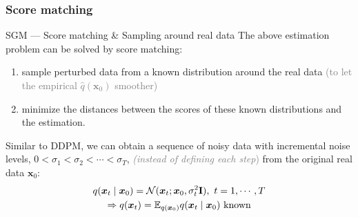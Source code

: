 \documentclass[10pt]{beamer}
\begin{document}
\subsubsection{Score matching}
\begin{frame}{SGM --- \normalsize Score matching \& Sampling around real data}
    The above estimation problem can be solved by score matching: 
    \begin{enumerate}
        \item sample perturbed data from a known distribution around the real data \textcolor{gray}{(to let the empirical $\hat{q}(\bm{x}_0)$ smoother)} 
        \item minimize the distances between the scores of these known distributions and the estimation.
    \end{enumerate}
    
    \bigskip
    
    Similar to DDPM, we can obtain a sequence of noisy data with incremental noise levels, 
    $0 < \sigma_1 < \sigma_2 < \cdots < \sigma_T$, \textcolor{gray}{\textit{(instead of defining each step})}
    from the original real data $\bm{x}_0$:
    \begin{gather}
        q(\bm{x}_t\mid\bm{x}_0) = \mathcal{N}(\bm{x}_t;\bm{x}_0,\sigma^2_t\mathbf{I}),~t=1,\cdots,T \label{eq:sgm}\\
        \Rightarrow q(\bm{x}_t) = \mathbb{E}_{q(\bm{x}_0)}q(\bm{x}_t\mid\bm{x}_0)~\text{known}\notag
    \end{gather}
\end{frame}
\end{document}
